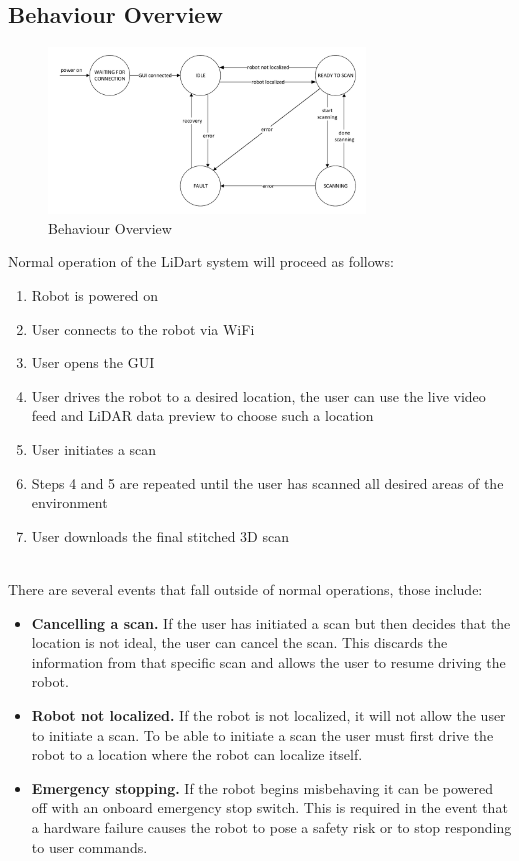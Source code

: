 \documentclass[12pt]{article}
\begin{document}
\subsection{Behaviour Overview}

\begin{figure}[H]
\begin{center}
    \includegraphics[width=0.75\textwidth]{Figures/Behaviour Overview.pdf}
\caption{Behaviour Overview}
\label{Fig_BehaviourOverview} 
\end{center}
\end{figure}

Normal operation of the LiDart system will proceed as follows:
\begin{enumerate}
\item Robot is powered on
\item User connects to the robot via WiFi
\item User opens the GUI
\item User drives the robot to a desired location, the user can use the live video feed and LiDAR data preview to choose such a location
\item User initiates a scan
\item Steps 4 and 5 are repeated until the user has scanned all desired areas of the environment
\item User downloads the final stitched 3D scan    
\end{enumerate}

\ \\
\noindent There are several events that fall outside of normal operations, those include:
\begin{itemize}
\item \textbf{Cancelling a scan.} If the user has initiated a scan but then decides that the location is not ideal, the user can cancel the scan. This discards the information from that specific scan and allows the user to resume driving the robot.
\item \textbf{Robot not localized.} If the robot is not localized, it will not allow the user to initiate a scan. To be able to initiate a scan the user must first drive the robot to a location where the robot can localize itself.
\item \textbf{Emergency stopping.} If the robot begins misbehaving it can be powered off with an onboard emergency stop switch. This is required in the event that a hardware failure causes the robot to pose a safety risk or to stop responding to user commands.
\end{itemize}
\end{document}
